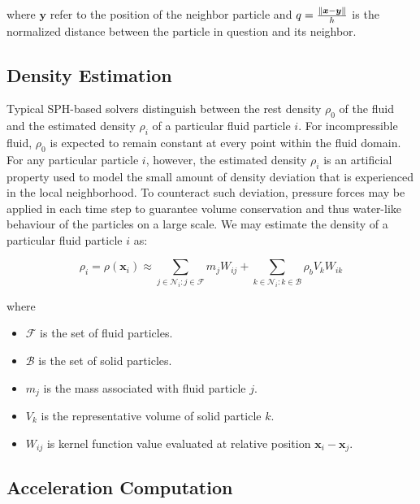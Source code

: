 \documentclass[
	11pt, 
	DIV10,
	ngerman,
	a4paper, 
	oneside, 
	headings=normal, 
	captions=tableheading,
	final, 
	numbers=noenddot
]{scrartcl}
\DeclarePairedDelimiter{\norm}{\lVert}{\rVert}
\begin{document}
where $ \boldsymbol{y} $ refer to the position of the neighbor particle and $ q = \frac{\norm{\boldsymbol{x} - \boldsymbol{y}}}{h} $ is the normalized distance between the particle in question and its neighbor.

\subsection{Density Estimation}

Typical SPH-based solvers distinguish between the rest density $ \rho_{0} $ of the fluid and the estimated density $ \rho_{i} $ of a particular fluid particle $ i $. For incompressible fluid, $ \rho_{0} $ is expected to remain constant at every point within the fluid domain. For any particular particle $ i $, however, the estimated density $ \rho_{i} $ is an artificial property used to model the small amount of density deviation that is experienced in the local neighborhood. To counteract such deviation, pressure forces may be applied in each time step to guarantee volume conservation and thus water-like behaviour of the particles on a large scale. We may estimate the density of a particular fluid particle $ i $ as:

\begin{equation}
    \label{eq14}
    \rho_{i} = \rho(\mathbf{x}_{i}) \approx \sum_{j \in \mathcal{N}_{i}:j \in \mathcal{F}} m_{j} W_{ij} + \sum_{k \in \mathcal{N}_{i}:k \in \mathcal{B}} \rho_{b} V_{k} W_{ik}
\end{equation}

where

\begin{itemize}
    \item $ \mathcal{F} $ is the set of fluid particles.
    \item $ \mathcal{B} $ is the set of solid particles.
    \item $ m_{j} $ is the mass associated with fluid particle $ j $.
    \item $ V_{k} $ is the representative volume of solid particle $ k $.
    \item $ W_{ij} $ is kernel function value evaluated at relative position $ \mathbf{x}_i - \mathbf{x}_j $.
\end{itemize}

\subsection{Acceleration Computation}
\end{document}
